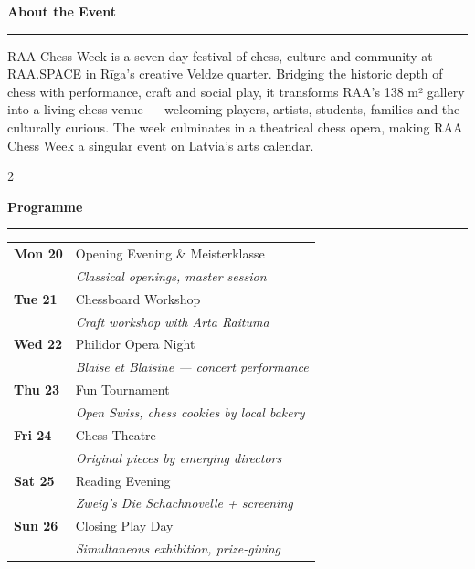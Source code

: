 \documentclass[a4paper,10pt]{article}
\newcommand{\sectionrule}[1]{%
  \vspace{4pt}%
  {\color{raared}\bfseries\large #1}\\[-2pt]%
  {\color{raared}\rule{\linewidth}{0.8pt}}%
  \vspace{3pt}%
}
\begin{document}
\begin{center}
\begin{minipage}{0.87\paperwidth}

\vspace{0.4cm}

\sectionrule{About the Event}

RAA Chess Week is a seven-day festival of chess, culture and community at RAA.SPACE in Rīga's creative Veldze quarter. Bridging the historic depth of chess with performance, craft and social play, it transforms RAA's 138 m² gallery into a living chess venue — welcoming players, artists, students, families and the culturally curious. The week culminates in a theatrical chess opera, making RAA Chess Week a singular event on Latvia's arts calendar.

\vspace{0.25cm}

\begin{multicols}{2}

\sectionrule{Programme}

{\footnotesize
\begin{tabular}{@{}ll@{}}
\textbf{Mon 20} & Opening Evening \& Meisterklasse \\
                & \textit{Classical openings, master session} \\[2pt]
\textbf{Tue 21} & Chessboard Workshop \\
                & \textit{Craft workshop with Arta Raituma} \\[2pt]
\textbf{Wed 22} & Philidor Opera Night \\
                & \textit{Blaise et Blaisine — concert performance} \\[2pt]
\textbf{Thu 23} & Fun Tournament \\
                & \textit{Open Swiss, chess cookies by local bakery} \\[2pt]
\textbf{Fri 24} & Chess Theatre \\
                & \textit{Original pieces by emerging directors} \\[2pt]
\textbf{Sat 25} & Reading Evening \\
                & \textit{Zweig's \textup{Die Schachnovelle} + screening} \\[2pt]
\textbf{Sun 26} & Closing Play Day \\
                & \textit{Simultaneous exhibition, prize-giving}\\
\end{tabular}
}


\end{multicols}
\end{minipage}
\end{center}
\end{document}
